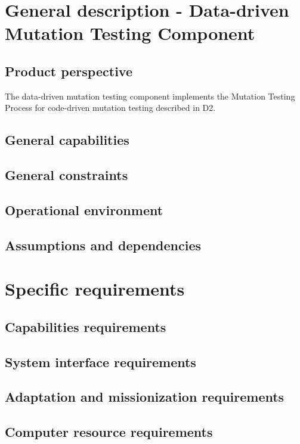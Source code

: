 



\section{General description - Data-driven Mutation Testing Component}




\subsection{Product perspective}
\RQ The data-driven mutation testing component implements the Mutation Testing Process for code-driven mutation testing described in D2.
\clearpage
\subsection{General capabilities}

\clearpage
\subsection{General constraints}
\subsection{Operational environment}
\subsection{Assumptions and dependencies}
\section{Specific requirements}
\subsection{Capabilities requirements}
\subsection{System interface requirements}
\subsection{Adaptation and missionization requirements }
\subsection{Computer resource requirements}
